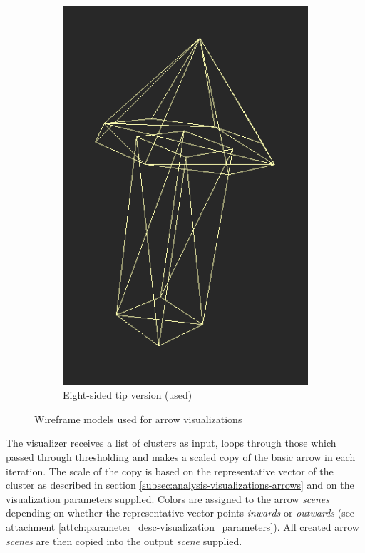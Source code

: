 \begin{figure}[h]
\begin{subfigure}{0.3\textwidth}
	\includegraphics[width=\textwidth]{./img/8sided_arrow.PNG}
    \caption{Eight-sided tip version (used)}
    \label{fig:meshdiff-8sided_arrow}
	\end{subfigure}
\caption[Wireframe models used for arrow visualizations]{Wireframe models used for arrow visualizations}
\end{figure}

The visualizer receives a list of clusters as input, loops through those which passed through thresholding and makes a scaled copy of the basic arrow in each iteration. The scale of the copy is based on the representative vector of the cluster as described in section \ref{subsec:analysis-visualizations-arrows} and on the visualization parameters supplied. Colors are assigned to the arrow {\it scenes} depending on whether the representative vector points {\it inwards} or {\it outwards} (see attachment \ref{attch:parameter_desc-visualization_parameters}). All created arrow {\it scenes} are then copied into the output {\it scene} supplied.


